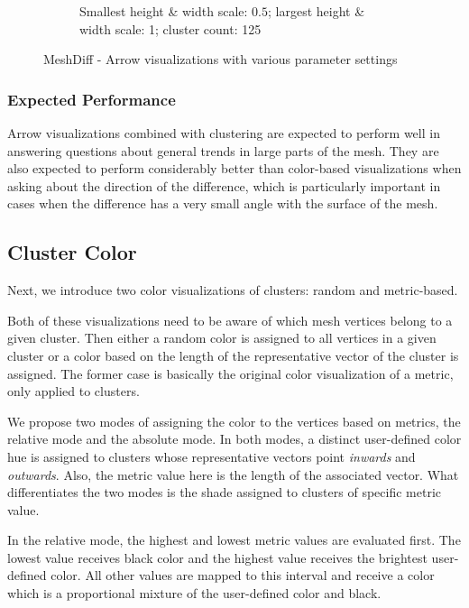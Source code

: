 \begin{figure}[h]
\begin{subfigure}{0.3\textwidth}
    \caption{Smallest height \& width scale: \(0.5\); largest height \& width scale: 1; cluster count: 125}
    \label{fig:meshdiff_arrows_1-125}
	\end{subfigure}
\caption[MeshDiff - Arrow visualizations with various parameter settings]{MeshDiff - Arrow visualizations with various parameter settings}
\end{figure}

\subsubsection{Expected Performance}

Arrow visualizations combined with clustering are expected to perform well in answering questions about general trends in large parts of the mesh. They are also expected to perform considerably better than color-based visualizations when asking about the direction of the difference, which is particularly important in cases when the difference has a very small angle with the surface of the mesh.
\subsection{Cluster Color}
\label{sec:analysis-color}

Next, we introduce two color visualizations of clusters: random and metric-based.

Both of these visualizations need to be aware of which mesh vertices belong to a given cluster. Then either a random color is assigned to all vertices in a given cluster or a color based on the length of the representative vector of the cluster is assigned. The former case is basically the original color visualization of a metric, only applied to clusters.

We propose two modes of assigning the color to the vertices based on metrics, the relative mode and the absolute mode. In both modes, a distinct user-defined color hue is assigned to clusters whose representative vectors point {\it inwards} and {\it outwards}. Also, the metric value here is the length of the associated vector. What differentiates the two modes is the shade assigned to clusters of specific metric value.

In the relative mode, the highest and lowest metric values are evaluated first. The lowest value receives black color and the highest value receives the brightest user-defined color. All other values are mapped to this interval and receive a color which is a proportional mixture of the user-defined color and black.

